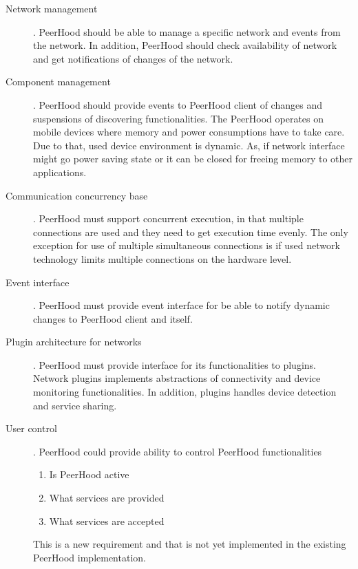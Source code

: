 \begin{description}
		\item[Network management]. PeerHood should be able to manage a specific network and events 
		from the network. 
		In addition, PeerHood should check availability of network and get notifications of changes 
		of the network.

		\item[Component management]. PeerHood should provide events to PeerHood client of changes 
		and suspensions of discovering functionalities. 
		The PeerHood operates on mobile devices where memory and power consumptions have to take 
		care. 
		Due to that, used device environment is dynamic. 
		As, if network interface might go power saving state or it can be closed for freeing memory 
		to other applications.

		\item[Communication concurrency base]. PeerHood must support concurrent execution, in that 
		multiple connections are used and they need to get execution time evenly. 
		The only exception for use of multiple simultaneous connections is if used network 
		technology limits multiple connections on the hardware level.

		\item[Event interface]. PeerHood must provide event interface for be able to notify 
		dynamic changes to PeerHood client and itself.

		\item[Plugin architecture for networks]. PeerHood must provide interface for its 
		functionalities to plugins. 
		Network plugins implements abstractions of connectivity and device monitoring 
		functionalities. 
		In addition, plugins handles device detection and service sharing.

		\item[User control]. PeerHood could provide ability to control PeerHood functionalities
		\begin{enumerate}
			\item Is PeerHood active
			\item What services are provided
			\item What services are accepted
		\end{enumerate}

		This is a new requirement and that is not yet implemented in the existing PeerHood 
		implementation.
\end{description}